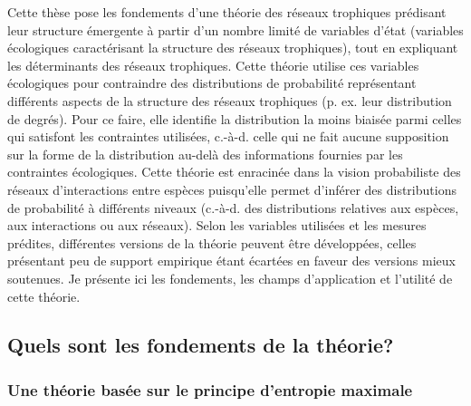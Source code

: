 Cette thèse pose les fondements d'une théorie des réseaux trophiques prédisant
leur structure émergente à partir d'un nombre limité de variables d'état
(variables écologiques caractérisant la structure des réseaux trophiques), tout
en expliquant les déterminants des réseaux trophiques. Cette théorie utilise ces
variables écologiques pour contraindre des distributions de probabilité
représentant différents aspects de la structure des réseaux trophiques (p. ex.
leur distribution de degrés). Pour ce faire, elle identifie la distribution la
moins biaisée parmi celles qui satisfont les contraintes utilisées, c.-à-d.
celle qui ne fait aucune supposition sur la forme de la distribution au-delà des
informations fournies par les contraintes écologiques. Cette théorie est
enracinée dans la vision probabiliste des réseaux d'interactions entre espèces
puisqu'elle permet d'inférer des distributions de probabilité à différents
niveaux (c.-à-d. des distributions relatives aux espèces, aux interactions ou
aux réseaux). Selon les variables utilisées et les mesures prédites, différentes
versions de la théorie peuvent être développées, celles présentant peu de
support empirique étant écartées en faveur des versions mieux soutenues. Je
présente ici les fondements, les champs d'application et l'utilité de cette
théorie. 

\subsection{Quels sont les fondements de la théorie?} 

\subsubsection{Une théorie basée sur le principe d'entropie maximale} 

